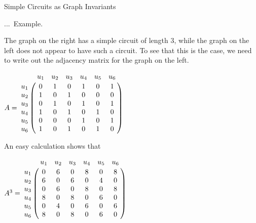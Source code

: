 \documentclass[smaller,hyperref={CJKbookmarks=true}]{beamer}
\newcounter{zhuo}[subsection]
\renewcommand{\thezhuo}{\thesection.\thesubsection.\arabic{zhuo}}
\newenvironment{EXAMPLE}{\stepcounter{zhuo}\alert{\!\thezhuo.~Example.\,}}{}
\begin{document}
\begin{frame}{Simple Circuits as Graph Invariants}
\begin{spacing}{1.05}
\begin{EXAMPLE}
\begin{center}
\end{center}
The graph on the right has a simple circuit of length 3, while the graph on
the left does not appear to have such a circuit. To see that this is the
case, we need to write out the adjacency matrix for the graph on the left.
\end{EXAMPLE}
\newpage
\begin{center}
$A=\bordermatrix{
& u_1 & u_2 & u_3 & u_4 & u_5 & u_6 \cr
u_1 & 0 & 1 & 0 & 1 & 0 & 1 \cr
u_2 & 1 & 0 & 1 & 0 & 0 & 0 \cr
u_3 & 0 & 1 & 0 & 1 & 0 & 1 \cr
u_4 & 1 & 0 & 1 & 0 & 1 & 0 \cr
u_5 & 0 & 0 & 0 & 1 & 0 & 1 \cr
u_6 & 1 & 0 & 1 & 0 & 1 & 0 \cr}$
\end{center}
An easy calculation shows that
\begin{center}
$A^3=\bordermatrix{
& u_1 & u_2 & u_3 & u_4 & u_5 & u_6 \cr
u_1 & 0 & 6 & 0 & 8 & 0 & 8 \cr
u_2 & 6 & 0 & 6 & 0 & 4 & 0 \cr
u_3 & 0 & 6 & 0 & 8 & 0 & 8 \cr
u_4 & 8 & 0 & 8 & 0 & 6 & 0 \cr
u_5 & 0 & 4 & 0 & 6 & 0 & 6 \cr
u_6 & 8 & 0 & 8 & 0 & 6 & 0 \cr}$
\end{center}
\end{spacing}
\end{frame}
\end{document}
